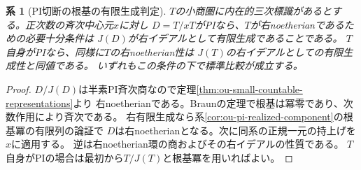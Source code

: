 \documentclass[11pt,a4paper]{ltjsarticle}
\newtheorem{corollary}[theorem]{系}
\theoremstyle{definition}
\begin{document}
\begin{corollary}[PI切断の根基の有限生成判定]
\label{cor:ou-pi-nil-finite-generation}
$T$の小商圏に内在的三次標識があるとする。正次数の斉次中心元$x$に対し
$D=T/xT$がPIなら、$T$が右noetherianであるための必要十分条件は
$J(D)$が右イデアルとして有限生成であることである。
$T$自身がPIなら、同様に$T$の右noetherian性は
$J(T)$の右イデアルとしての有限生成性と同値である。
いずれもこの条件の下で標準比較が成立する。
\end{corollary}
\begin{proof}
$D/J(D)$は半素PI斉次商なので定理\ref{thm:ou-small-countable-representations}より
右noetherianである。Braunの定理で根基は冪零であり、次数作用により斉次である。
右有限生成なら系\ref{cor:ou-pi-realized-component}の根基冪の有限列の論証で
$D$は右noetherianとなる。次に同系の正規一元の持上げを$x$に適用する。
逆は右noetherian環の商およびその右イデアルの性質である。
$T$自身がPIの場合は最初から$T/J(T)$と根基冪を用いればよい。
\end{proof}
\end{document}
